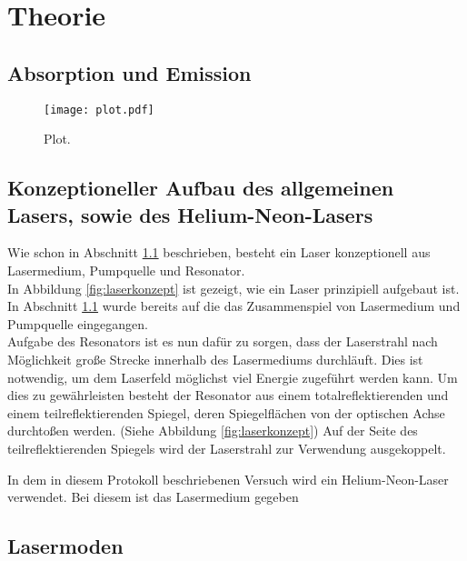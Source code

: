 \section{Theorie}
\label{sec:Theorie}


\subsection{Absorption und Emission}
\label{subsec:absorption_und_emission}

\begin{figure}
  \centering
  \texttt{[image: plot.pdf]}
  \caption{Plot. \cite{sample}}
  \label{fig:plot}
\end{figure}


\subsection{Konzeptioneller Aufbau des allgemeinen Lasers, sowie des Helium-Neon-Lasers}
\label{subsec:konzeptioneller_aufbau}

Wie schon in Abschnitt \ref{subsec:absorption_und_emission}
beschrieben, besteht ein Laser konzeptionell aus Lasermedium,
Pumpquelle und Resonator.\\
In Abbildung \ref{fig:laserkonzept} ist gezeigt,
wie ein Laser prinzipiell aufgebaut ist.
In Abschnitt \ref{subsec:absorption_und_emission}
wurde bereits auf die das Zusammenspiel von Lasermedium
und Pumpquelle eingegangen.\\
Aufgabe des Resonators ist es nun dafür zu sorgen,
dass der Laserstrahl nach Möglichkeit große Strecke innerhalb
des Lasermediums durchläuft. Dies ist notwendig,
um dem Laserfeld möglichst viel Energie zugeführt
werden kann. Um dies zu gewährleisten besteht der Resonator
aus einem totalreflektierenden und einem teilreflektierenden Spiegel,
deren Spiegelflächen von der optischen Achse durchtoßen werden.
(Siehe Abbildung \ref{fig:laserkonzept})
Auf der Seite des teilreflektierenden Spiegels wird der Laserstrahl
zur Verwendung ausgekoppelt.

In dem in diesem Protokoll beschriebenen
Versuch wird ein Helium-Neon-Laser verwendet.
Bei diesem ist das Lasermedium gegeben






\subsection{Lasermoden}
\label{subsec:lasermoden}
